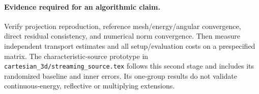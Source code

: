 \documentclass[11pt]{article}
\begin{document}
\paragraph{Evidence required for an algorithmic claim.}
Verify projection reproduction, reference mesh/energy/angular convergence, direct
residual consistency, and numerical norm convergence. Then measure independent
transport estimates and all setup/evaluation costs on a prespecified matrix.
The characteristic-source prototype in
\texttt{cartesian\_3d/streaming\_source.tex} follows this second stage and includes
its randomized baseline and inner errors. Its one-group results do not validate
continuous-energy, reflective or multiplying extensions.
\end{document}
